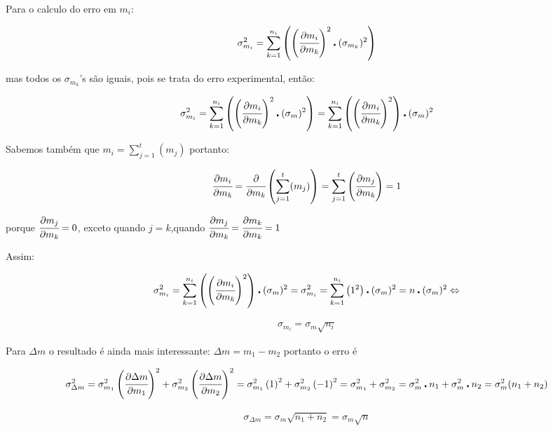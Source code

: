 \documentclass[a4paper]{article}
\begin{document}
Para o calculo do erro em $m_{i}$:

\begin{align}
	\sigma_{m_{i}}^{2}={\displaystyle \sum_{k=1}^{n_{i}}\left(\left(\cfrac{\partial m_{i}}{\partial m_{k}}\right)^{2}\centerdot(\sigma_{m_{k}})^{2}\right)}
\end{align}

mas todos os $\sigma_{m_{k}}$'s são iguais, pois se trata do erro experimental, então:

$$\sigma_{m_{i}}^{2}={\displaystyle \sum_{k=1}^{n_{i}}\left(\left(\cfrac{\partial m_{i}}{\partial m_{k}}\right)^{2}\centerdot(\sigma_{m})^{2}\right)}={\displaystyle \sum_{k=1}^{n_{i}}\left(\left(\cfrac{\partial m_{i}}{\partial m_{k}}\right)^{2}\right)}\centerdot(\sigma_{m})^{2}$$

Sabemos também que $m_{i}={\displaystyle \sum_{j=1}^{t}(m_{j})}$ portanto:

$$\cfrac{\partial m_{i}}{\partial m_{k}}=\cfrac{\partial}{\partial m_{k}}\left({\displaystyle \sum_{j=1}^{t}(m_{j})}\right)={\displaystyle \sum_{j=1}^{t}\left(\cfrac{\partial m_{j}}{\partial m_{k}}\right)=1}$$

porque $ \cfrac{\partial m_{j}}{\partial m_{k}}=0 $, exceto quando $j=k$,quando $\cfrac{\partial m_{j}}{\partial m_{k}}=\cfrac{\partial m_{k}}{\partial m_{k}}=1$

Assim:

$$\sigma_{m_{i}}^{2}={\displaystyle \sum_{k=1}^{n_{i}}\left(\left(\cfrac{\partial m_{i}}{\partial m_{k}}\right)^{2}\right)}\centerdot(\sigma_{m})^{2}=\sigma_{m_{i}}^{2}={\displaystyle \sum_{k=1}^{n_{i}}\left(1^{2}\right)}\centerdot(\sigma_{m})^{2}={\displaystyle n}\centerdot(\sigma_{m})^{2}\Leftrightarrow$$

\begin{align}
\sigma_{m_{i}}=\sigma_{m}\sqrt{n_{i}}
\end{align}

Para $\Delta m$ o resultado é ainda mais interessante: $\Delta m=m_{1}-m_{2}$ portanto o erro é 

$$\sigma_{\Delta m}^{2}=\sigma_{m_{1}}^{2}\left(\cfrac{\partial\Delta m}{\partial m_{1}}\right)^{2}+\sigma_{m_{2}}^{2}\left(\cfrac{\partial\Delta m}{\partial m_{2}}\right)^{2}=\sigma_{m_{1}}^{2}\left(1\right)^{2}+\sigma_{m_{2}}^{2}\left(-1\right)^{2}=\sigma_{m_{1}}^{2}+\sigma_{m_{2}}^{2}=\sigma_{m}^{2}\centerdot n_{1}+\sigma_{m}^{2}\centerdot n_{2}=\sigma_{m}^{2}(n_{1}+n_{2})$$

\begin{align}
\sigma_{\Delta m}=\sigma_{m}\sqrt{n_{1}+n_{2}}=\sigma_{m}\sqrt{n}
\end{align}
\end{document}
